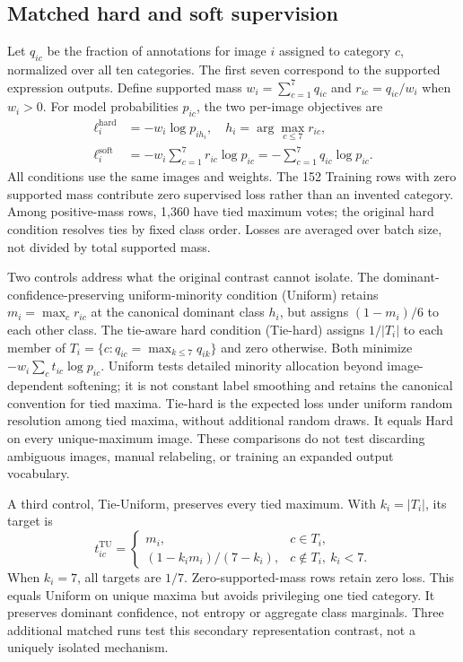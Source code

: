 \documentclass[pdflatex,sn-mathphys-num]{sn-jnl}
\begin{document}
\subsection{Matched hard and soft supervision}
Let $q_{ic}$ be the fraction of annotations for image $i$ assigned to category $c$, normalized over all ten categories. The first seven correspond to the supported expression outputs. Define supported mass $w_i=\sum_{c=1}^{7}q_{ic}$ and $r_{ic}=q_{ic}/w_i$ when $w_i>0$. For model probabilities $p_{ic}$, the two per-image objectives are
\begin{align}
\ell_i^{\mathrm{hard}}&=-w_i\log p_{i h_i},\quad h_i=\arg\max_{c\leq7}r_{ic},\\
\ell_i^{\mathrm{soft}}&=-w_i\sum_{c=1}^{7}r_{ic}\log p_{ic}
                     =-\sum_{c=1}^{7}q_{ic}\log p_{ic}.
\end{align}
All conditions use the same images and weights. The 152 Training rows with zero supported mass contribute zero supervised loss rather than an invented category. Among positive-mass rows, 1,360 have tied maximum votes; the original hard condition resolves ties by fixed class order. Losses are averaged over batch size, not divided by total supported mass.

Two controls address what the original contrast cannot isolate. The dominant-confidence-preserving uniform-minority condition (Uniform) retains $m_i=\max_c r_{ic}$ at the canonical dominant class $h_i$, but assigns $(1-m_i)/6$ to each other class. The tie-aware hard condition (Tie-hard) assigns $1/|T_i|$ to each member of $T_i=\{c:q_{ic}=\max_{k\leq7}q_{ik}\}$ and zero otherwise. Both minimize $-w_i\sum_c t_{ic}\log p_{ic}$. Uniform tests detailed minority allocation beyond image-dependent softening; it is not constant label smoothing and retains the canonical convention for tied maxima. Tie-hard is the expected loss under uniform random resolution among tied maxima, without additional random draws. It equals Hard on every unique-maximum image. These comparisons do not test discarding ambiguous images, manual relabeling, or training an expanded output vocabulary.

A third control, Tie-Uniform, preserves every tied maximum. With $k_i=|T_i|$, its target is
\begin{equation}
t_{ic}^{\mathrm{TU}}=\begin{cases}m_i,&c\in T_i,\\(1-k_i m_i)/(7-k_i),&c\notin T_i,\ k_i<7.\end{cases}
\end{equation}
When $k_i=7$, all targets are $1/7$. Zero-supported-mass rows retain zero loss. This equals Uniform on unique maxima but avoids privileging one tied category. It preserves dominant confidence, not entropy or aggregate class marginals. Three additional matched runs test this secondary representation contrast, not a uniquely isolated mechanism.
\end{document}
